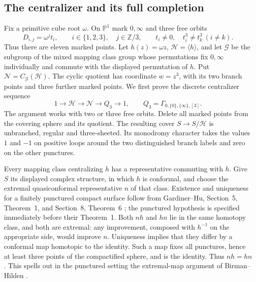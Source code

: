 \subsection{The centralizer and its full completion}

Fix a primitive cube root $\omega$. On $\mathbb P^1$ mark
$0,\infty$ and three free orbits
\[
 D_{i,j}=\omega^j t_i,
 \qquad i\in\{1,2,3\},\quad j\in\mathbb Z/3,
 \qquad t_i\ne0,\quad t_i^3\ne t_k^3\ (i\ne k).
\]
Thus there are eleven marked points. Let $h(z)=\omega z$,
$\mathcal H=\langle h\rangle$, and let $\mathcal G$ be the subgroup of the
mixed mapping class group whose permutations fix $0,\infty$
individually and commute with the displayed permutation of
$h$. Put $\mathcal N=C_{\mathcal G}(\mathcal H)$. The cyclic quotient has coordinate
$w=z^3$, with its two branch points and three further marked
points. We first prove the discrete centralizer sequence
\begin{equation}\label{eq:cubic-normalizer-3}
1\longrightarrow \mathcal H\longrightarrow \mathcal N\longrightarrow
 Q_3\longrightarrow1,
 \qquad Q_3=\Gamma_{0,\{0\},\{\infty\},[3]}.
\end{equation}
The argument works with two or three free orbits. Delete all
marked points from the covering sphere and its quotient.
The resulting cover $S\to S/\mathcal H$ is unbranched, regular and
three-sheeted. Its monodromy character takes the values $1$
and $-1$ on positive loops around the two distinguished
branch labels and zero on the other punctures.

Every mapping class centralizing $h$ has a
representative commuting with $h$. Give $S$ its displayed
complex structure, in which $h$ is conformal, and choose the
extremal quasiconformal representative $n$ of that class.
Existence and uniqueness for a finitely punctured compact
surface follow from Gardiner--Hu, Section~5, Theorem~1,
and Section~8, Theorem~6
\cite[author pp.~14--15 and~22]{CubicGH}; the punctured
hypothesis is specified immediately before their Theorem~1.
Both $nh$ and $hn$ lie in the same homotopy class, and both
are extremal: any improvement, composed with $h^{-1}$ on
the appropriate side, would improve $n$. Uniqueness implies
that they differ by a conformal map homotopic to the identity.
Such a map fixes all punctures, hence at least three points
of the compactified sphere, and is the identity. Thus $nh=hn$.
This spells out in the punctured setting the extremal-map
argument of Birman--Hilden \cite[p.~433]{CubicBH}.

